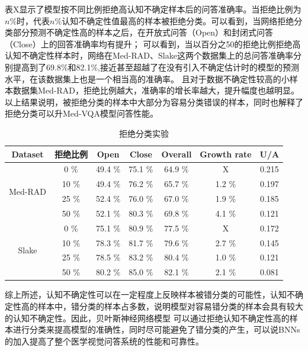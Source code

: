 表X显示了模型按不同比例拒绝高认知不确定样本后的问答准确率。当拒绝比例为$n \%$时，代表$n \%$认知不确定性值最高的样本被拒绝分类。可以看到，当网络拒绝分类部分预测不确定性高的样本之后，在开放式问答（Open）和封闭式问答（Close）上的回答准确率均有提升；
可以看到，当以百分之50的拒绝比例拒绝高认知不确定性样本时，网络在Med-RAD、Slake这两个数据集上的总问答准确率分别提高到了69.8\%和82.1\%,接近甚至超越了在没有引入不确定估计时的模型的预测水平，在该数据集上也是一个相当高的准确率。
且对于数据不确定性较高的小样本数据集Med-RAD，拒绝比例越大，准确率的增长率越大，提升幅度也越明显。以上结果说明，被拒绝分类的样本中大部分为容易分类错误的样本，同时也解释了拒绝分类可以升Med-VQA模型问答性能。
\begin{table}
	\caption{\label{reject_exm}拒绝分类实验}
	\centering
	\small %
	\begin{tabular}{c|c|ccccc}
		\hline Dataset & 拒绝比例 & Open &  Close & Overall & Growth rate & U/A \\
		\hline \multirow{4}{*}{Med-RAD} & 0 \%& 49.4 \%& 75.1 \%& 64.9 \%& X& 0.215 \\
		& 10 \%& 49.4 \%& 76.2 \%& 65.7 \%& 1.2 \% & 0.197 \\
		& 25 \%& 52.4 \%& 76.0 \%& 67.0 \%& 1.9 \% & 0.185 \\
		& 50 \%& 52.1 \%& 80.3 \%& 69.8 \%& 4.1 \% & 0.121 \\
		\hline \multirow{4}{*}{Slake} & 0 \%& 75.1 \%& 80.9 \%& 77.5 \%& X& 0.172 \\
		& 10 \%& 78.3 \%& 81.7 \%& 79.6 \%& 2.7 \% & 0.145 \\
		& 25 \%& 78.5 \%& 83.2 \%& 80.4 \%& 1.0 \% & 0.121 \\
		& 50 \%& 80.2 \%& 85.0 \%& 82.1 \%& 2.1 \% & 0.081 \\
		\hline
	\end{tabular}
\end{table}

综上所述，认知不确定性可以在一定程度上反映样本被错分类的可能性，认知不确定性高的样本中，错分类的样本占多数，说明模型对容易错分类的样本会具有较大的认知不确定性。因此，贝叶斯神经网络模型
可以通过拒绝认知不确定性高的样本进行分类来提高模型的准确性，同时尽可能避免了错分类的产生，可以说BNNs的加入提高了整个医学视觉问答系统的性能和可靠性。


